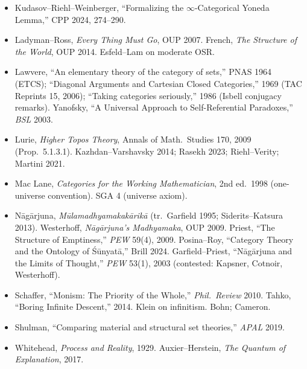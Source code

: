 \documentclass[11pt]{article}
\theoremstyle{plain}
\theoremstyle{definition}
\theoremstyle{remark}
\begin{document}
\begin{itemize}[itemsep=1pt]
\item Kudasov--Riehl--Weinberger, ``Formalizing the $\infty$-Categorical Yoneda Lemma,'' CPP 2024, 274--290.
\item Ladyman--Ross, \emph{Every Thing Must Go}, OUP 2007. French, \emph{The Structure of the World}, OUP 2014. Esfeld--Lam on moderate OSR.
\item Lawvere, ``An elementary theory of the category of sets,'' PNAS 1964 (ETCS); ``Diagonal Arguments and Cartesian Closed Categories,'' 1969 (TAC Reprints 15, 2006); ``Taking categories seriously,'' 1986 (Isbell conjugacy remarks). Yanofsky, ``A Universal Approach to Self-Referential Paradoxes,'' \emph{BSL} 2003.
\item Lurie, \emph{Higher Topos Theory}, Annals of Math.\ Studies 170, 2009 (Prop.\ 5.1.3.1). Kazhdan--Varshavsky 2014; Rasekh 2023; Riehl--Verity; Martini 2021.
\item Mac Lane, \emph{Categories for the Working Mathematician}, 2nd ed.\ 1998 (one-universe convention). SGA 4 (universe axiom).
\item N\=ag\=arjuna, \emph{M\=ulamadhyamakak\=arik\=a} (tr.\ Garfield 1995; Siderits--Katsura 2013). Westerhoff, \emph{N\=ag\=arjuna's Madhyamaka}, OUP 2009. Priest, ``The Structure of Emptiness,'' \emph{PEW} 59(4), 2009. Posina--Roy, ``Category Theory and the Ontology of \'S\=unyat\=a,'' Brill 2024. Garfield--Priest, ``N\=ag\=arjuna and the Limits of Thought,'' \emph{PEW} 53(1), 2003 (contested: Kapsner, Cotnoir, Westerhoff).
\item Schaffer, ``Monism: The Priority of the Whole,'' \emph{Phil.\ Review} 2010. Tahko, ``Boring Infinite Descent,'' 2014. Klein on infinitism. Bohn; Cameron.
\item Shulman, ``Comparing material and structural set theories,'' \emph{APAL} 2019.
\item Whitehead, \emph{Process and Reality}, 1929. Auxier--Herstein, \emph{The Quantum of Explanation}, 2017.
\end{itemize}
\end{document}

